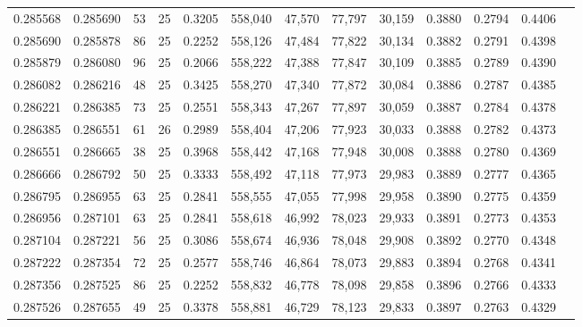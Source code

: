 \begin{tabular}{rrrrrrrrrrrrr}
0.285568 & 0.285690 &    53 &  25 &                                     0.3205 & 558,040 &  47,570 &  77,797 &  30,159 & 0.3880 & 0.2794 & 0.4406 \\
0.285690 & 0.285878 &    86 &  25 &                                     0.2252 & 558,126 &  47,484 &  77,822 &  30,134 & 0.3882 & 0.2791 & 0.4398 \\
0.285879 & 0.286080 &    96 &  25 &                                     0.2066 & 558,222 &  47,388 &  77,847 &  30,109 & 0.3885 & 0.2789 & 0.4390 \\
0.286082 & 0.286216 &    48 &  25 &                                     0.3425 & 558,270 &  47,340 &  77,872 &  30,084 & 0.3886 & 0.2787 & 0.4385 \\
0.286221 & 0.286385 &    73 &  25 &                                     0.2551 & 558,343 &  47,267 &  77,897 &  30,059 & 0.3887 & 0.2784 & 0.4378 \\
0.286385 & 0.286551 &    61 &  26 &                                     0.2989 & 558,404 &  47,206 &  77,923 &  30,033 & 0.3888 & 0.2782 & 0.4373 \\
0.286551 & 0.286665 &    38 &  25 &                                     0.3968 & 558,442 &  47,168 &  77,948 &  30,008 & 0.3888 & 0.2780 & 0.4369 \\
0.286666 & 0.286792 &    50 &  25 &                                     0.3333 & 558,492 &  47,118 &  77,973 &  29,983 & 0.3889 & 0.2777 & 0.4365 \\
0.286795 & 0.286955 &    63 &  25 &                                     0.2841 & 558,555 &  47,055 &  77,998 &  29,958 & 0.3890 & 0.2775 & 0.4359 \\
0.286956 & 0.287101 &    63 &  25 &                                     0.2841 & 558,618 &  46,992 &  78,023 &  29,933 & 0.3891 & 0.2773 & 0.4353 \\
0.287104 & 0.287221 &    56 &  25 &                                     0.3086 & 558,674 &  46,936 &  78,048 &  29,908 & 0.3892 & 0.2770 & 0.4348 \\
0.287222 & 0.287354 &    72 &  25 &                                     0.2577 & 558,746 &  46,864 &  78,073 &  29,883 & 0.3894 & 0.2768 & 0.4341 \\
0.287356 & 0.287525 &    86 &  25 &                                     0.2252 & 558,832 &  46,778 &  78,098 &  29,858 & 0.3896 & 0.2766 & 0.4333 \\
0.287526 & 0.287655 &    49 &  25 &                                     0.3378 & 558,881 &  46,729 &  78,123 &  29,833 & 0.3897 & 0.2763 & 0.4329 \\

\end{tabular}
